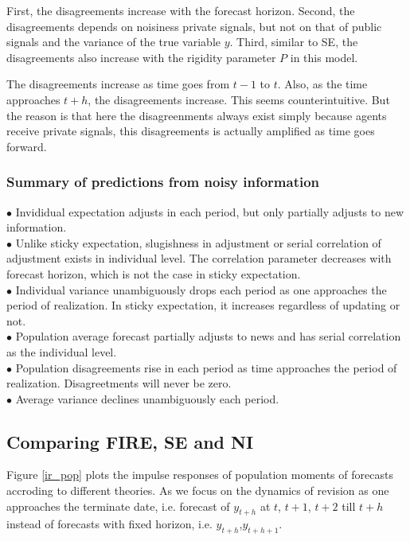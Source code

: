 \documentclass[]{article}
\begin{document}
First, the disagreements increase with the forecast horizon.  Second, the disagreements depends on noisiness private signals, but not on that of public signals and the variance of the true variable $y$. Third, similar to SE, the disagreements also increase with the rigidity parameter $P$ in this model.

The disagreements increase as time goes from $t-1$ to $t$. Also, as the time approaches $t+h$, the disagreements increase. This seems counterintuitive. But the reason is that here the disagreenments always exist simply because agents receive private signals, this disagreements is actually amplified as time goes forward. 


\subsubsection{Summary of predictions from noisy information}

$\bullet$  Invididual expectation adjusts in each period, but only partially adjusts to new information. \\
$\bullet$ Unlike sticky expectation, slugishness in adjustment or serial correlation of adjustment exists in individual level. The correlation parameter decreases with forecast horizon, which is not the case in sticky expectation.\\
$\bullet$  Individual variance unambiguously drops each period as one approaches the period of realization. In sticky expectation, it increases regardless of updating or not. \\ 
$\bullet$  Population average forecast partially adjusts to news and has serial correlation as the individual level. \\
$\bullet$  Population disagreements rise in each period as time approaches the period of realization. Disagreetments will never be zero. \\
$\bullet$  Average variance declines unambiguously each period. 

\subsection{Comparing FIRE, SE and NI}

Figure \ref{ir_pop} plots the impulse responses of population moments of forecasts accroding to different theories. As we focus on the dynamics of revision as one approaches the terminate date, i.e. forecast of $y_{t+h}$ at $t$, $t+1$, $t+2$ till $t+h$ instead of forecasts with fixed horizon, i.e. $y_{t+h}$,$y_{t+h+1}$. 
\end{document}
